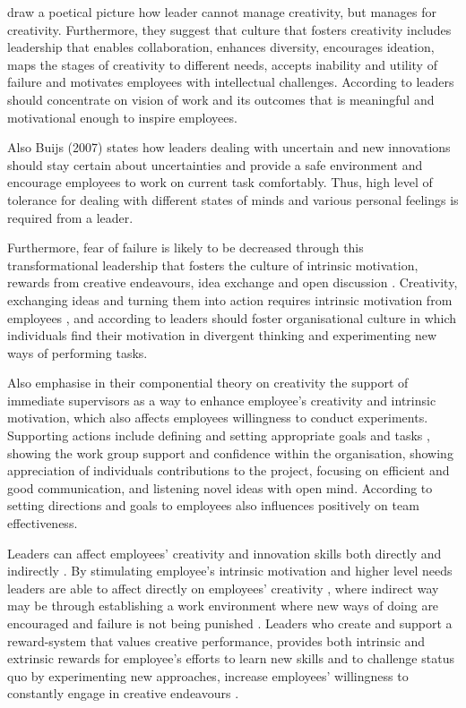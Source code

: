 \citet{amabile2008creativity} draw a poetical picture how leader cannot manage creativity, but manages for creativity. Furthermore, they suggest that culture that fosters creativity includes leadership that enables collaboration, enhances diversity, encourages ideation, maps the stages of creativity to different needs, accepts inability and utility of failure and motivates employees with intellectual challenges. According to \citet{sosik1999leadership} leaders should concentrate on vision of work and its outcomes that is meaningful and motivational enough to inspire employees.

Also Buijs (2007) \citet{buijs2007innovation} states how leaders dealing with uncertain and new innovations should stay certain about uncertainties and provide a safe environment and encourage employees to work on current task comfortably. Thus, high level of tolerance for dealing with different states of minds and various personal feelings is required from a leader. \citep{buijs2007innovation} 

Furthermore, fear of failure is likely to be decreased through this transformational leadership that fosters the culture of intrinsic motivation, rewards from creative endeavours, idea exchange and open discussion \citet{amabile1998kill}. Creativity, exchanging ideas and turning them into action requires intrinsic motivation from employees \citep{jung2001transformational}, and according to \citet{amabile1998kill} leaders should foster organisational culture in which individuals find their motivation in divergent thinking and experimenting new ways of performing tasks. 

Also \citet{amabile2004leader} emphasise in their componential theory on creativity the support of immediate supervisors as a way to enhance employee's creativity and intrinsic motivation, which also affects employees willingness to conduct experiments. Supporting actions include defining and setting appropriate goals and tasks \citet{amabile1998kill}, showing the work group support and confidence within the organisation, showing appreciation of individuals contributions to the project, focusing on efficient and good communication, and listening novel ideas with open mind. \citep{amabile2004leader} According to \citet{hackman1987design} setting directions and goals to employees also influences positively on team effectiveness.

Leaders can affect employees' creativity and innovation skills both directly and indirectly \citep{jung2003role}. By stimulating employee's intrinsic motivation and higher level needs leaders are able to affect directly on employees' creativity \citep{tierney1999examination}, where indirect way may be through establishing a work environment where new ways of doing are encouraged and failure is not being punished \citep{amabile1996assessing}. Leaders who create and support a reward-system that values creative performance, provides both intrinsic and extrinsic rewards for employee's efforts to learn new skills and to challenge status quo by experimenting new approaches, increase employees' willingness to constantly engage in creative endeavours \citep{jung2001transformational,mumford1988creativity}.

